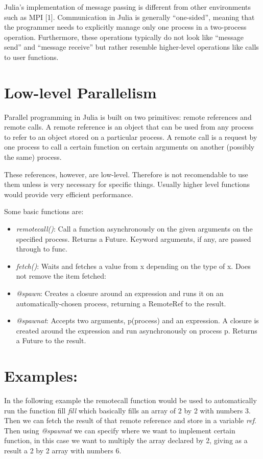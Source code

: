 \documentclass[letterpaper,10pt,english]{sphinxmanual}
\begin{document}
Julia’s implementation of message passing is different from other environments such as MPI {[}1{]}. Communication in Julia is generally “one-sided”, meaning that the programmer needs to explicitly manage only one process in a two-process operation. Furthermore, these operations typically do not look like “message send” and “message receive” but rather resemble higher-level operations like calls to user functions.


\section{Low-level Parallelism}
\label{JuliaPar:low-level-parallelism}
Parallel programming in Julia is built on two primitives: remote references and remote calls. A remote reference is an object that can be used from any process to refer to an object stored on a particular process. A remote call is a request by one process to call a certain function on certain arguments on another (possibly the same) process.

These references, however,  are low-level. Therefore is not recomendable to use them unless is very necessary for specific things. Usually higher level functions would provide very efficient performance.

Some basic functions are:
\begin{itemize}
\item {} 
\emph{remotecall()}: Call a function asynchronously on the given arguments on the specified process. Returns a Future. Keyword arguments, if any, are passed through to func.

\item {} 
\emph{fetch()}: Waits and fetches a value from x depending on the type of x. Does not remove the item fetched:

\item {} 
\emph{@spawn}: Creates a closure around an expression and runs it on an automatically-chosen process, returning a RemoteRef to the result.

\item {} 
\emph{@spawnat}: Accepts two arguments, p(process) and an expression. A closure is created around the expression and run asynchronously on process p. Returns a Future to the result.

\end{itemize}


\section{Examples:}
\label{JuliaPar:examples}
In the following example the remotecall function would be used to automatically run the function fill \emph{fill} which basically fills an array of 2 by 2 with numbers 3. Then we can fetch the result of that remote reference and store in a variable \emph{ref}. Then using \emph{@spawnat} we can specify where we want to implement certain function, in this case we want to multiply the array declared by 2, giving as a result a 2 by 2 array with numbers 6.
\end{document}
